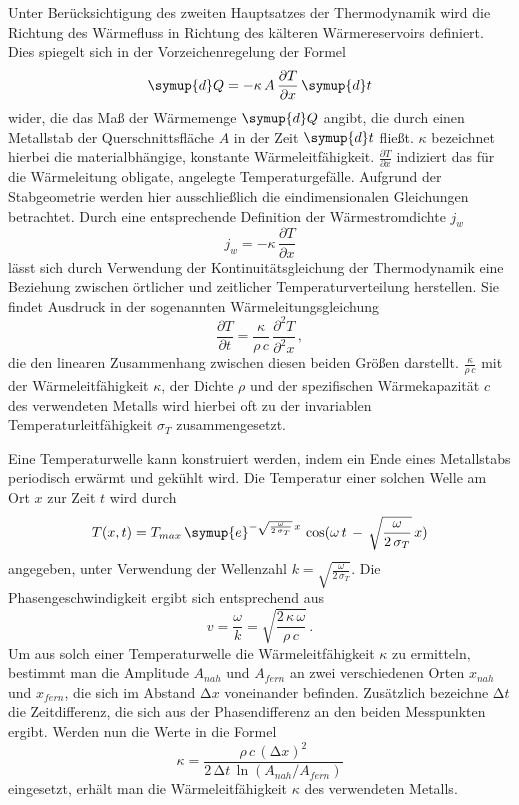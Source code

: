 Unter Berücksichtigung des zweiten Hauptsatzes der Thermodynamik wird die Richtung des Wärmefluss in Richtung des 
kälteren Wärmereservoirs definiert. 
Dies spiegelt sich in der Vorzeichenregelung der Formel 
\begin{equation}
    \symup{d}Q = - \kappa \, A \, \frac{\partial T}{\partial x} \, \symup{d}t 
\end{equation}
wider, die das Maß der Wärmemenge $\symup{d}Q$ angibt, die durch einen Metallstab der Querschnittsfläche $A$ in der Zeit 
$\symup{d}t$ fließt. 
$\kappa$ bezeichnet hierbei die materialbhängige, konstante Wärmeleitfähigkeit. 
$\frac{\partial T}{\partial x}$ indiziert das für die Wärmeleitung obligate, angelegte Temperaturgefälle.
Aufgrund der Stabgeometrie werden hier ausschließlich die eindimensionalen Gleichungen betrachtet.
Durch eine entsprechende Definition der Wärmestromdichte $j_w$
\begin{equation}
    j_w = - \kappa \, \frac{\partial T}{\partial x}
\end{equation}
lässt sich durch Verwendung der Kontinuitätsgleichung der Thermodynamik eine Beziehung zwischen örtlicher und zeitlicher 
Temperaturverteilung herstellen. 
Sie findet Ausdruck in der sogenannten Wärmeleitungsgleichung 
\begin{equation}
    \frac{\partial T}{\partial t} = \frac{\kappa}{\rho \, c} \, \frac{\partial^2 T}{\partial^2 x} \, ,
\end{equation}
die den linearen Zusammenhang zwischen diesen beiden Größen darstellt. 
$\frac{\kappa}{\rho \, c}$ mit der Wärmeleitfähigkeit $\kappa$, der Dichte $\rho$ und der spezifischen Wärmekapazität $c$ 
des verwendeten Metalls wird hierbei oft zu der invariablen Temperaturleitfähigkeit $\sigma_T$ zusammengesetzt. 

Eine Temperaturwelle kann konstruiert werden, indem ein Ende eines Metallstabs periodisch erwärmt und gekühlt wird. 
Die Temperatur einer solchen Welle am Ort $x$ zur Zeit $t$ wird durch
\begin{equation}
    T(x,t) = T_{max} \, \symup{e}^{- \sqrt{\frac{\omega}{2 \, \sigma_T}} \, x} \, \cos(\omega \, t \, - \, \sqrt{\frac{\omega}{2 \, \sigma_T}} \, x )
\end{equation}
angegeben, unter Verwendung der Wellenzahl $k = \sqrt{\frac{\omega}{2 \, \sigma_T}}$. 
Die Phasengeschwindigkeit ergibt sich entsprechend aus 
\begin{equation}
    v = \frac{\omega}{k} = \sqrt{\frac{2 \, \kappa \, \omega}{\rho \, c}} \, .
\end{equation}
Um aus solch einer Temperaturwelle die Wärmeleitfähigkeit $\kappa$ zu ermitteln, bestimmt man die Amplitude 
$A_{nah}$ und $A_{fern}$ an zwei verschiedenen Orten $x_{nah}$ und $x_{fern}$, die sich im Abstand $\increment x$ 
voneinander befinden. Zusätzlich bezeichne $\increment t$ die Zeitdifferenz, die sich aus der Phasendifferenz 
an den beiden Messpunkten ergibt. 
Werden nun die Werte in die Formel 
\begin{equation}
    \kappa = \frac{\rho \, c \, (\increment x)^2}{2 \, \increment t \, \ln(A_{nah} / A_{fern})}
\end{equation}
eingesetzt, erhält man die Wärmeleitfähigkeit $\kappa$ des verwendeten Metalls. 
